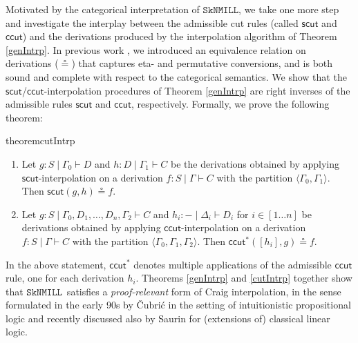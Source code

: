 \documentclass[sn-mathphys-num]{sn-jnl}%
\newcommand{\GG}{\Gamma}
\newcommand{\GD}{\Delta}
\newcommand{\vd}{\vdash}
\newcommand{\bsls}{\backslash}
\newcommand{\SkNMILL}{$\mathtt{SkNMILL}$}
\newcommand{\mf}[1]{\mathsf{#1}}
\theoremstyle{thmstyleone}%
\theoremstyle{thmstyletwo}%
\theoremstyle{thmstylethree}%
\begin{document}
Motivated by the categorical interpretation of \SkNMILL, we take one more step and investigate the interplay between the admissible cut rules (called $\mf{scut}$ and $\mf{ccut}$) and the derivations produced by the interpolation algorithm of Theorem \ref{genIntrp}.
In previous work \cite{UVW:protsn}, we introduced an equivalence relation on derivations ($\circeq$) that captures eta- and permutative conversions, and is both sound and complete with respect to the categorical semantics.
We show that the $\mf{scut}$/$\mf{ccut}$-interpolation procedures of Theorem \ref{genIntrp} are right inverses of the admissible rules $\mf{scut}$ and $\mf{ccut}$, respectively. Formally, we prove the following theorem:
\begin{restatable*}{theorem}{cutIntrp}\label{cutIntrp}
  \begin{enumerate}[label=(\roman*)]
  \item Let $g : S \mid \GG_0 \vd D$ and $h : D \mid \GG_1 \vd C$ be the derivations obtained by applying $\mf{scut}$-interpolation on a derivation $f: S \mid \GG \vd C$ with the partition $\langle \GG_0 , \GG_1 \rangle$. Then $\mf{scut}(g, h) \circeq f$.
  \item Let $g : S \mid \GG_0 , D_1 , \dots, D_n, \GG_2 \vd C$ and $h_i : {-} \mid \GD_i \vd D_i$ for $i \in [1 \dots n]$ be derivations obtained by applying $\mf{ccut}$-interpolation on a derivation $f: S \mid \GG \vd C$ with the partition $\langle \GG_0 , \GG_1 , \GG_2 \rangle$. Then $\mf{ccut}^*([h_i] , g) \circeq f$.
  \end{enumerate}
\end{restatable*}

In the above statement, $\mf{ccut}^*$ denotes multiple applications of the admissible $\mf{ccut}$ rule, one for each derivation $h_i$.
Theorems \ref{genIntrp} and \ref{cutIntrp} together show that \SkNMILL\ satisfies a \emph{proof-relevant} form of Craig interpolation, in the sense  formulated in the early 90s by {\v{C}}ubri{\'c} \cite{Cubric1994} in the setting of intuitionistic propositional logic and recently discussed also by Saurin \cite{Saurin2024} for (extensions of) classical linear logic.

\end{document}

